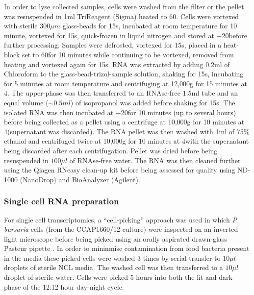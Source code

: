 In order to lyse collected samples, cells were washed from the filter or the 
pellet was resuspended in 1ml TriReagent (Sigma) heated to \(60\)\celsius. 
Cells were vortexed with sterile \(300\mu m\) glass-beads for 15s, incubated at 
room temperature for 10 minute, vortexed for 15s, quick-frozen in liquid 
nitrogen and stored at \(-20\)\celsius before further processing.  
Samples were defrosted, vortexed for 15s, placed in a heat-block set 
to \(60\)\celsius for 10 minutes while continuing to be vortexed, removed from 
heating and vortexed again for 15s.  
RNA was extracted by adding 0.2ml of Chloroform to the glass-bead-trizol-sample 
solution, shaking for 15s, incubating for 5 minutes at room temperature and 
centrifuging at 12,000g for 15 minutes at 4\celsius.  
The upper-phase was then transferred to an RNAse-free 1.5ml tube and an 
equal volume (\(\sim0.5ml\)) of isopropanol was added before shaking for 15s.  
The isolated RNA was then incubated at \(-20\)\celsius for 10 minutes 
(up to several hours) before being collected as a pellet using a centrifuge at 
10,000g for 10 minutes at 4\celsius (supernatant was discarded). 
The RNA pellet was then washed with 1ml of 75\% ethanol and centrifuged 
twice at 10,000g for 10 minutes at 4\celsius with the supernatant being 
discarded after each centrifugation.  
Pellet was dried before being resuspended in \(100\mu l\) of RNAse-free water.  
The RNA was then cleaned further using the Qiagen RNeasy clean-up kit 
before being assessed for quality using ND-1000 (NanoDrop) and BioAnalyzer (Agilent).


\subsubsection{Single cell RNA preparation}
For single cell transcriptomics, a ``cell-picking'' approach was used in which
\textit{P. bursaria} cells (from the CCAP1660/12 culture) were inspected on an inverted light microscope 
before being picked using an orally aspirated drawn-glass Pasteur pipette \citep{Garcia-Cuetos2012}.
In order to mininmise contamination from food bacteria present in the media these picked cells
were washed 3 times by serial transfer to \(10\mu l\) droplets of sterile NCL media.
The washed cell was then transferred to a \(10\mu l\) droplet of sterile water.
Cells were picked 5 hours into both the lit and dark phase of the 12:12 hour day-night cycle.



